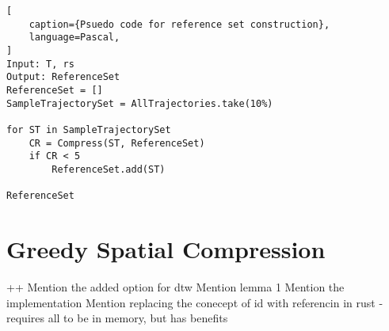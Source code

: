 \begin{lstlisting}[
    caption={Psuedo code for reference set construction},
    language=Pascal,
]
Input: T, rs
Output: ReferenceSet
ReferenceSet = []
SampleTrajectorySet = AllTrajectories.take(10%)

for ST in SampleTrajectorySet
    CR = Compress(ST, ReferenceSet)
    if CR < 5 
        ReferenceSet.add(ST)

ReferenceSet
\end{lstlisting}


\section{Greedy Spatial Compression}
++ Mention the added option for dtw
Mention lemma 1
Mention the implementation
Mention replacing the conecept of id with referencin in rust - requires all to be in memory, but has benefits



